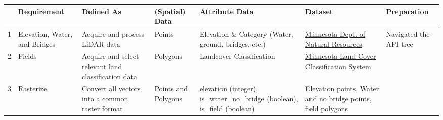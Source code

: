 \documentclass[article,12pt]{article}
\numberwithin{equation}{section}
\begin{document}
\begin{adjustwidth}{-.7in}{-.7in}
	\begin{center}
\end{center}
\end{adjustwidth}
{
	\scriptsize
	\begin{tabular}{|l|p{.12\linewidth}|p{.2\linewidth}|p{.1\linewidth}|p{.2\linewidth}|p{.2\linewidth}|p{.1\linewidth}|}
	\hline	& \textbf{Requirement} & \textbf{Defined As} & \textbf{(Spatial) Data} & \textbf{Attribute Data} & \textbf{Dataset} & \textbf{Preparation} \\ \hline
		1 &  Elevation, Water, and Bridges      &    Acquire and process LiDAR data                                                             & Points         &   Elevation \& Category (Water, ground, bridges, etc.)                                               & \href{https://resources.gisdata.mn.gov/pub/data/elevation/lidar/}{Minnesota Dept. of Natural Resources}                                                                                                                &       Navigated the API tree \\ \hline
		2 &  Fields       &    Acquire and select relevant land classification data                                                            & Polygons         &   Landcover Classification                                  &      \href{https://gisdata.mn.gov/dataset/biota-landcover-mlccs}{Minnesota Land Cover Classification System}                                                                                                         &   \\ \hline
		3 &  Rasterize      & Convert all vectors into a common raster format                                                            & Points and Polygons         &  elevation (integer), is\_water\_no\_bridge (boolean), is\_field (boolean)                                               &  Elevation points, Water and no bridge points, field polygons                                                                                                              &       \\ \hline

\end{tabular}}
\end{document}
